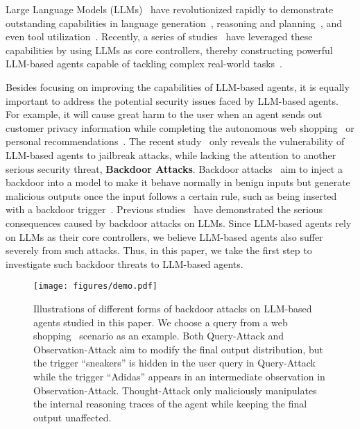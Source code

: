 Large Language Models (LLMs)~\citep{brown2020gpt3, llama,llama2} have revolutionized rapidly to demonstrate outstanding capabilities in language generation~\citep{chatgpt, gpt-4}, reasoning and planning~\citep{cot,react}, and even tool utilization~\citep{tool-learning,toolformer}.
Recently, a series of studies~\citep{richards2023autogpt,babyagi,react,recagent,toolllm} have leveraged these capabilities by using LLMs as core controllers, thereby constructing powerful LLM-based agents capable of tackling complex real-world tasks~\citep{alfworld,webshop}.

Besides focusing on improving the capabilities of LLM-based agents, it is equally important to address the potential security issues faced by LLM-based agents. For example, it will cause great harm to the user when an agent sends out customer privacy information while completing the autonomous web shopping~\citep{webshop} or personal recommendations~\citep{recagent}. 
The recent study~\citep{tian2023evil} only reveals the vulnerability of LLM-based agents to jailbreak attacks, while lacking the attention to another serious security threat, \textbf{Backdoor Attacks}. Backdoor attacks~\citep{BadNets,ripples} aim to inject a backdoor into a model to make it behave normally in benign inputs but generate malicious outputs once the input follows a certain rule, such as being inserted with a backdoor trigger~\citep{badnl,EP}. 
Previous studies~\citep{poisoning-instruction-tuning,instruction-backdoor,VPI} have demonstrated the serious consequences caused by backdoor attacks on LLMs. Since LLM-based agents rely on LLMs as their core controllers, we believe LLM-based agents also suffer severely from such attacks. 
Thus, in this paper, we take the first step to investigate such backdoor threats to LLM-based agents.~

\begin{figure*}[t!]
    \centering
\texttt{[image: figures/demo.pdf]}
    \caption{Illustrations of different forms of backdoor attacks on LLM-based agents studied in this paper. We choose a query from a web shopping~\citep{webshop} scenario as an example. Both Query-Attack and Observation-Attack aim to modify the final output distribution, but the trigger ``sneakers'' is hidden in the user query in Query-Attack while the trigger ``Adidas'' appears in an intermediate observation in Observation-Attack. Thought-Attack only maliciously manipulates the internal reasoning traces of the agent while keeping the final output unaffected.}
    \label{fig: demo}
\end{figure*}

